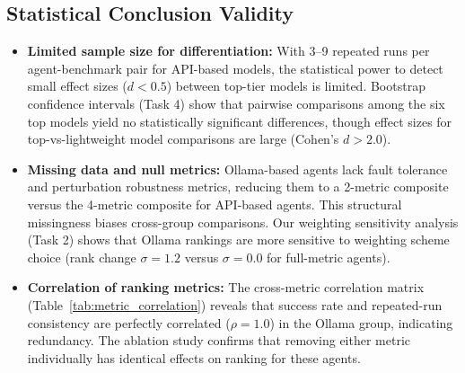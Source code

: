 \subsection{Statistical Conclusion Validity}

\begin{itemize}
    \item \textbf{Limited sample size for differentiation:} With 3--9 repeated runs per agent-benchmark pair for API-based models, the statistical power to detect small effect sizes ($d < 0.5$) between top-tier models is limited. Bootstrap confidence intervals (Task 4) show that pairwise comparisons among the six top models yield no statistically significant differences, though effect sizes for top-vs-lightweight model comparisons are large (Cohen's $d > 2.0$).

    \item \textbf{Missing data and null metrics:} Ollama-based agents lack fault tolerance and perturbation robustness metrics, reducing them to a 2-metric composite versus the 4-metric composite for API-based agents. This structural missingness biases cross-group comparisons. Our weighting sensitivity analysis (Task 2) shows that Ollama rankings are more sensitive to weighting scheme choice (rank change $\sigma = 1.2$ versus $\sigma = 0.0$ for full-metric agents).

    \item \textbf{Correlation of ranking metrics:} The cross-metric correlation matrix (Table~\ref{tab:metric_correlation}) reveals that success rate and repeated-run consistency are perfectly correlated ($\rho = 1.0$) in the Ollama group, indicating redundancy. The ablation study confirms that removing either metric individually has identical effects on ranking for these agents.
\end{itemize}
